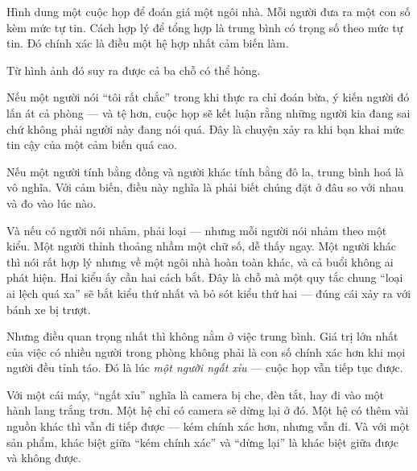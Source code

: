 \documentclass[../../vslam.tex]{subfiles}
\begin{document}
\begin{dongian}
Hình dung một cuộc họp để đoán giá một ngôi nhà. Mỗi người đưa ra một con số kèm mức tự tin. Cách hợp lý để tổng hợp là trung bình có trọng số theo mức tự tin. Đó chính xác là điều một hệ hợp nhất cảm biến làm.

Từ hình ảnh đó suy ra được cả ba chỗ có thể hỏng.

Nếu một người nói ``tôi rất chắc'' trong khi thực ra chỉ đoán bừa, ý kiến người đó lấn át cả phòng --- và tệ hơn, cuộc họp sẽ kết luận rằng những người kia đang sai chứ không phải người này đang nói quá. Đây là chuyện xảy ra khi bạn khai mức tin cậy của một cảm biến quá cao.

Nếu một người tính bằng đồng và người khác tính bằng đô la, trung bình hoá là vô nghĩa. Với cảm biến, điều này nghĩa là phải biết chúng đặt ở đâu so với nhau và đo vào lúc nào.

Và nếu có người nói nhảm, phải loại --- nhưng mỗi người nói nhảm theo một kiểu. Một người thỉnh thoảng nhầm một chữ số, dễ thấy ngay. Một người khác thì nói rất hợp lý nhưng về một ngôi nhà hoàn toàn khác, và cả buổi không ai phát hiện. Hai kiểu ấy cần hai cách bắt. Đây là chỗ mà một quy tắc chung ``loại ai lệch quá xa'' sẽ bắt kiểu thứ nhất và bỏ sót kiểu thứ hai --- đúng cái xảy ra với bánh xe bị trượt.

Nhưng điều quan trọng nhất thì không nằm ở việc trung bình. Giá trị lớn nhất của việc có nhiều người trong phòng không phải là con số chính xác hơn khi mọi người đều tỉnh táo. Đó là lúc \emph{một người ngất xỉu} --- cuộc họp vẫn tiếp tục được.

Với một cái máy, ``ngất xỉu'' nghĩa là camera bị che, đèn tắt, hay đi vào một hành lang trắng trơn. Một hệ chỉ có camera sẽ dừng lại ở đó. Một hệ có thêm vài nguồn khác thì vẫn đi tiếp được --- kém chính xác hơn, nhưng vẫn đi. Và với một sản phẩm, khác biệt giữa ``kém chính xác'' và ``dừng lại'' là khác biệt giữa được và không được.

\end{dongian}
\end{document}
